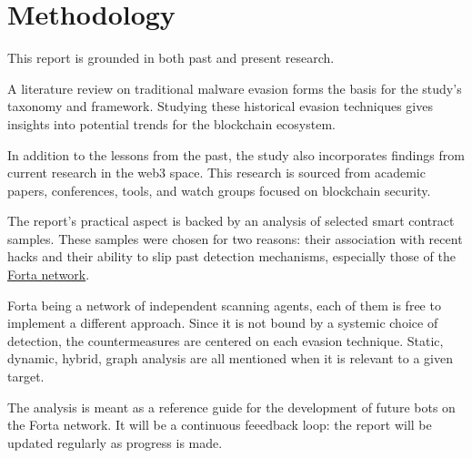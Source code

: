 \section{Methodology} \label{sec:methodology}

This report is grounded in both past and present research.

A literature review on traditional malware evasion forms the basis for the study's taxonomy and framework.
Studying these historical evasion techniques gives insights into potential trends for the blockchain ecosystem.

In addition to the lessons from the past, the study also incorporates findings from current research in the web3 space.
This research is sourced from academic papers, conferences, tools, and watch groups focused on blockchain security.

The report's practical aspect is backed by an analysis of selected smart contract samples.
These samples were chosen for two reasons: their association with recent hacks and their ability to slip past detection mechanisms, especially those of the \href{https://explorer.forta.network/}{Forta network}.

Forta being a network of independent scanning agents, each of them is free to implement a different approach.
Since it is not bound by a systemic choice of detection, the countermeasures are centered on each evasion technique.
Static, dynamic, hybrid, graph analysis are all mentioned when it is relevant to a given target.

The analysis is meant as a reference guide for the development of future bots on the Forta network.
It will be a continuous feeedback loop: the report will be updated regularly as progress is made.

